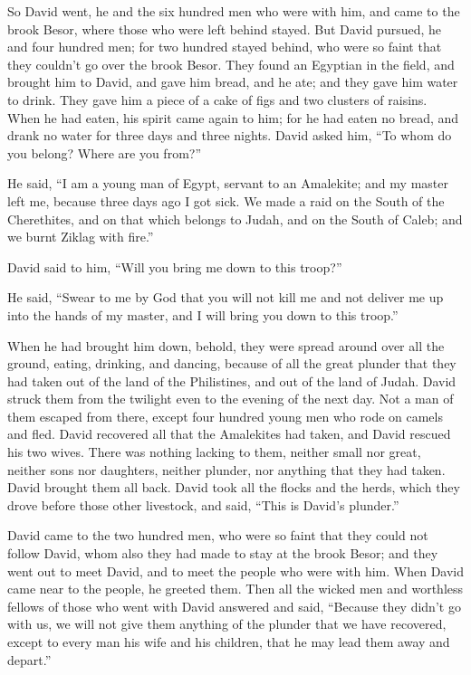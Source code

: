  So David went, he and the six hundred men who were with
him, and came to the brook Besor, where those who were left behind
stayed.  But David pursued, he and four hundred men; for
two hundred stayed behind, who were so faint that they couldn't go over
the brook Besor.  They found an Egyptian in the field,
and brought him to David, and gave him bread, and he ate; and they gave
him water to drink.  They gave him a piece of a cake of
figs and two clusters of raisins. When he had eaten, his spirit came
again to him; for he had eaten no bread, and drank no water for three
days and three nights.  David asked him, ``To whom do you
belong? Where are you from?''

He said, ``I am a young man of Egypt, servant to an Amalekite; and my
master left me, because three days ago I got sick.  We
made a raid on the South of the Cherethites, and on that which belongs
to Judah, and on the South of Caleb; and we burnt Ziklag with fire.''

 David said to him, ``Will you bring me down to this
troop?''

He said, ``Swear to me by God that you will not kill me and not deliver
me up into the hands of my master, and I will bring you down to this
troop.''

 When he had brought him down, behold, they were spread
around over all the ground, eating, drinking, and dancing, because of
all the great plunder that they had taken out of the land of the
Philistines, and out of the land of Judah.  David struck
them from the twilight even to the evening of the next day. Not a man of
them escaped from there, except four hundred young men who rode on
camels and fled.  David recovered all that the Amalekites
had taken, and David rescued his two wives.  There was
nothing lacking to them, neither small nor great, neither sons nor
daughters, neither plunder, nor anything that they had taken. David
brought them all back.  David took all the flocks and the
herds, which they drove before those other livestock, and said, ``This
is David's plunder.''

 David came to the two hundred men, who were so faint
that they could not follow David, whom also they had made to stay at the
brook Besor; and they went out to meet David, and to meet the people who
were with him. When David came near to the people, he greeted them.
 Then all the wicked men and worthless fellows of those
who went with David answered and said, ``Because they didn't go with us,
we will not give them anything of the plunder that we have recovered,
except to every man his wife and his children, that he may lead them
away and depart.''

